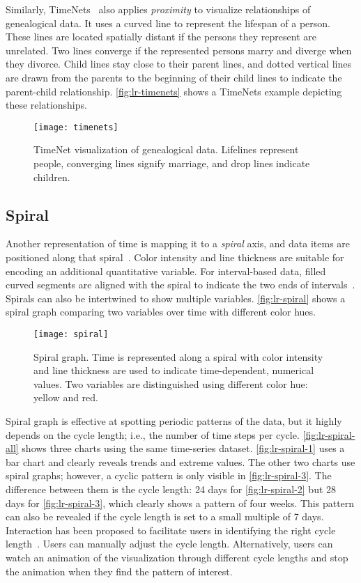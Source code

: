 Similarly, TimeNets~\cite{Kim2010} also applies \emph{proximity} to visualize relationships of genealogical data. It uses a curved line to represent the lifespan of a person. These lines are located spatially distant if the persons they represent are unrelated. Two lines converge if the represented persons marry and diverge when they divorce. Child lines stay close to their parent lines, and dotted vertical lines are drawn from the parents to the beginning of their child lines to indicate the parent-child relationship. \autoref{fig:lr-timenets} shows a TimeNets example depicting these relationships.

\begin{figure}[!htb]
	\centering
	\texttt{[image: timenets]}
	\caption{TimeNet visualization of genealogical data. Lifelines represent people, converging lines signify marriage, and drop lines indicate children. }
	\label{fig:lr-timenets}
\end{figure}

\subsection{Spiral}
Another representation of time is mapping it to a \emph{spiral} axis, and data items are positioned along that spiral~\cite{Weber2001}. Color intensity and line thickness are suitable for encoding an additional quantitative variable. For interval-based data, filled curved segments are aligned with the spiral to indicate the two ends of intervals~\cite{Carlis1998}. Spirals can also be intertwined to show multiple variables. \autoref{fig:lr-spiral} shows a spiral graph comparing two variables over time with different color hues. 

\begin{figure}[!htb]
	\centering
	\texttt{[image: spiral]}
	\caption{Spiral graph. Time is represented along a spiral with color intensity and line thickness are used to indicate time-dependent, numerical values. Two variables are distinguished using different color hue: yellow and red. }
	\label{fig:lr-spiral}
\end{figure}

Spiral graph is effective at spotting periodic patterns of the data, but it highly depends on the cycle length; i.e., the number of time steps per cycle. \autoref{fig:lr-spiral-all} shows three charts using the same time-series dataset. \autoref{fig:lr-spiral-1} uses a bar chart and clearly reveals trends and extreme values. The other two charts use spiral graphs; however, a cyclic pattern is only visible in \autoref{fig:lr-spiral-3}. The difference between them is the cycle length: 24 days for \autoref{fig:lr-spiral-2} but 28 days for \autoref{fig:lr-spiral-3}, which clearly shows a pattern of four weeks. This pattern can also be revealed if the cycle length is set to a small multiple of 7 days. Interaction has been proposed to facilitate users in identifying the right cycle length~\cite{Weber2001,Tominski2008}. Users can manually adjust the cycle length. Alternatively, users can watch an animation of the visualization through different cycle lengths and stop the animation when they find the pattern of interest.

